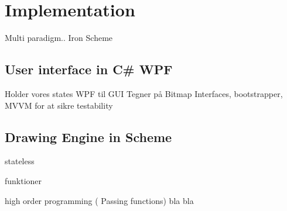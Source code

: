 \chapter{Implementation} 
\label{chp:impl}

Multi paradigm.. Iron Scheme



\section{User interface in C\# WPF}

Holder vores states
WPF til GUI
Tegner på Bitmap
Interfaces, bootstrapper, MVVM for at sikre testability

\section{Drawing Engine in Scheme}


stateless

funktioner

high order programming ( Passing functions) bla bla